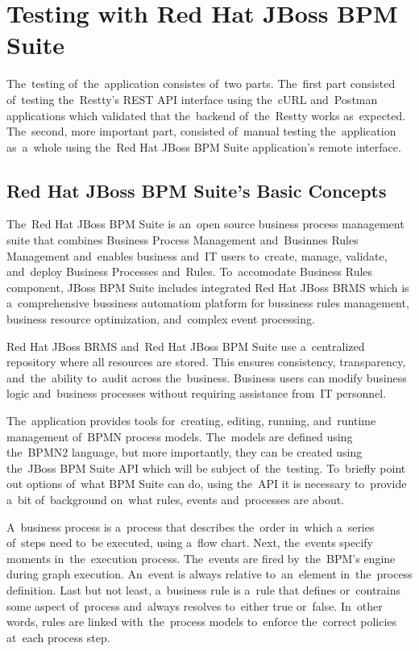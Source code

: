 \section{Testing with Red Hat JBoss BPM Suite}
\label{Testing}
The~testing of~the~application consistes of~two parts. The~first part consisted of~testing the~Restty's REST API
interface using the~cURL and~Postman applications which validated that the~backend of~the~Restty works as~expected.
The~second, more important part, consisted of~manual testing the~application as~a~whole using the~Red Hat JBoss BPM
Suite application's remote interface.

\subsection{Red Hat JBoss BPM Suite's Basic Concepts}
The~Red Hat JBoss BPM Suite is an~open source business process management suite that combines Business Process Management
and~Businnes Rules Management and~enables business and~IT users to~create, manage, validate, and~deploy Business Processes
and~Rules. To~accomodate Business Rules component, JBoss BPM Suite includes integrated Red Hat JBoss BRMS which is a~comprehensive
bussiness automatiom platform for bussiness rules management, business resource optimization, and~complex event processing.

Red Hat JBoss BRMS and~Red Hat JBoss BPM Suite use a~centralized repository where all resources are stored. This ensures
consistency, transparency, and~the~ability to~audit across the~business. Business users can modify business logic and~business processes
without requiring assistance from~IT personnel.

The~application provides tools for~creating, editing, running, and~runtime management of~BPMN process models. The~models are defined
using the~BPMN2 language, but more importantly, they can be created using the~JBoss BPM Suite API which will be subject of~the~testing.
To~briefly point out options of~what BPM Suite can do, using the~API it is necessary to~provide a~bit of~background on~what rules, events
and~processes are about.

A~business process is a~process that describes the~order in~which a~series of~steps need to~be executed, using a~flow chart. Next, the~events
specify moments in~the~execution process. The~events are fired by~the~BPM's engine during graph execution. An~event is always relative to~an~element
in~the~process definition. Last but not least, a~business rule is a~rule that defines or~contrains some aspect of~process and~always resolves to~either
true or~false. In~other words, rules are linked with~the~process models to~enforce the~correct policies at~each process step.


